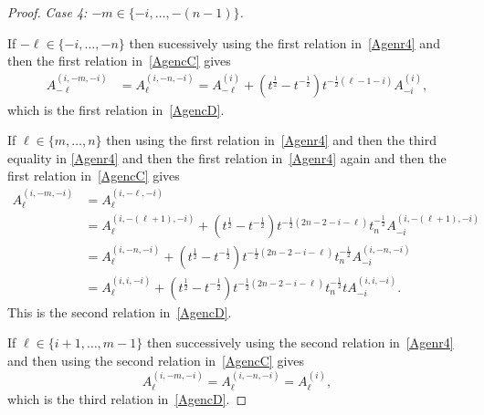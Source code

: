 \documentclass[11pt]{article}
\theoremstyle{plain}
\theoremstyle{definition}
\theoremstyle{remark}
\numberwithin{equation}{section}
\newcounter{r}
\newcounter{s}
\begin{document}
\begin{proof}
\smallskip\noindent
\emph{Case 4: $-m\in \{-i, \ldots, -(n-1)\}$.}

\noindent
If $-\ell\in \{-i, \ldots, -n\}$ then sucessively using the first relation in~\eqref{Agenr4}
and then the first relation in~\eqref{AgencC} gives
\begin{align*}
A^{(i,-m,-i)}_{-\ell}
&= A^{(i,-n,-i)}_{\ell}
=A^{(i)}_{-\ell}+(t^{\frac12}-t^{-\frac12})t^{-\frac12(\ell-1-i)}A^{(i)}_{-i},
\end{align*}
which is the first relation in~\eqref{AgencD}.

\noindent
If $\ell\in \{m, \ldots,n\}$ then using the first relation in~\eqref{Agenr4} and then the third equality in 
\eqref{Agenr4} and then the first relation in~\eqref{Agenr4} again and then the first relation in~\eqref{AgencC} gives
\begin{align*}
A^{(i,-m,-i)}_\ell 
&= A^{(i, -\ell,-i)}_\ell \\
&=  A^{(i,-(\ell+1),-i)}_{\ell}
+ (t^{\frac12}-t^{-\frac12})t^{-\frac12(2n-2-i-\ell)}t_n^{-\frac12}
A^{(i,-(\ell+1),-i)}_{-i}  \\
&= A^{(i,-n,-i)}_{\ell} + (t^{\frac12}-t^{-\frac12})t^{-\frac12(2n-2-i-\ell)}t_n^{-\frac12}
A^{(i,-n,-i)}_{-i} \\
&= A^{(i,i,-i)}_{\ell} + (t^{\frac12}-t^{-\frac12})t^{-\frac12(2n-2-i-\ell)}t_n^{-\frac12} t A^{(i,i,-i)}_{-i}.
\end{align*}
This is the second relation in~\eqref{AgencD}. 

\noindent
If $\ell\in \{i+1,\ldots, m-1\}$ then successively using the second relation in~\eqref{Agenr4} 
and then using the second relation in~\eqref{AgencC} gives 
$$A^{(i,-m,-i)}_\ell = A^{(i,-n,-i)}_\ell = A^{(i)}_\ell,$$
which is the third relation in~\eqref{AgencD}.


\end{proof}
\end{document}
